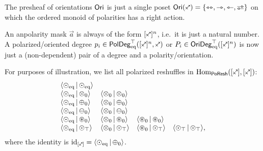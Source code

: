 \documentclass[a4paper]{memoir}
\begin{document}
The presheaf of orientations ${\mathsf{Ori}}$ is just a single poset $\oripsh(\ypolar) = \accol{\equijetsym, \jetsym, \tejsym, \infrajetsym}$ on which the ordered monoid of polarities has a right action.

An anpolarity mask $\vec a$ is always of the form $[\ypolar]^n$, i.e.\ it is just a natural number.
A polarized/oriented degree $\pdeg p i \in \poldegeqtop([\ypolar]^n, \ypolar)$ or $\odeg P i \in \oridegeqtop([\ypolar]^n)$ is now just a (non-dependent) pair of a degree and a polarity/orientation.

For purposes of illustration, we list all polarized reshuffles in $\Hom_\poreshcat([\ypolar], [\ypolar])$:
\[
	\begin{array}{l l l l}
		\mathopen{}\left\langle {{\odot}}_{{\mathrm{eq}}} \,\middle|\, {{\odot}}_{{\mathrm{eq}}} \right\rangle\mathclose{} \\
		\mathopen{}\left\langle {{\odot}}_{{\mathrm{eq}}} \,\middle|\, {{\otimes}}_{0} \right\rangle\mathclose{} &
		\mathopen{}\left\langle {{\otimes}}_{0} \,\middle|\, {{\otimes}}_{0} \right\rangle\mathclose{} \\
		\mathopen{}\left\langle {{\odot}}_{{\mathrm{eq}}} \,\middle|\, {{\oplus}}_{0} \right\rangle\mathclose{} &
		\mathopen{}\left\langle {{\otimes}}_{0} \,\middle|\, {{\oplus}}_{0} \right\rangle\mathclose{} \\
		\mathopen{}\left\langle {{\odot}}_{{\mathrm{eq}}} \,\middle|\, {{\ominus}}_{0} \right\rangle\mathclose{} &
		\mathopen{}\left\langle {{\otimes}}_{0} \,\middle|\, {{\ominus}}_{0} \right\rangle\mathclose{} \\
		\mathopen{}\left\langle {{\odot}}_{{\mathrm{eq}}} \,\middle|\, {{\oast}}_{0} \right\rangle\mathclose{} &
		\mathopen{}\left\langle {{\otimes}}_{0} \,\middle|\, {{\oast}}_{0} \right\rangle\mathclose{} &
		\mathopen{}\left\langle {{\oast}}_{0} \,\middle|\, {{\oast}}_{0} \right\rangle\mathclose{} \\
		\mathopen{}\left\langle {{\odot}}_{{\mathrm{eq}}} \,\middle|\, {{\odot}}_{\top} \right\rangle\mathclose{} &
		\mathopen{}\left\langle {{\otimes}}_{0} \,\middle|\, {{\odot}}_{\top} \right\rangle\mathclose{} &
		\mathopen{}\left\langle {{\oast}}_{0} \,\middle|\, {{\odot}}_{\top} \right\rangle\mathclose{} &
		\mathopen{}\left\langle {{\odot}}_{\top} \,\middle|\, {{\odot}}_{\top} \right\rangle\mathclose{},
	\end{array}
\]
where the identity is $\id_{[\ypolar]} = \reshlist{\pdeg \nonpol \eqtydeg}{\pdeg \pospol 0}$.
\end{document}
